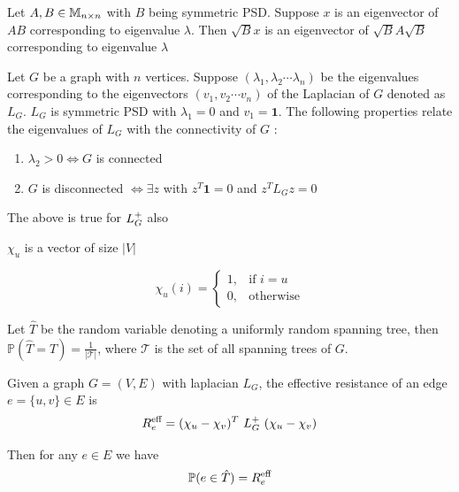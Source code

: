 \begin{HXf}
 Let $A, B \in \mathbb{M}_{n \times n}$ with $B$ being symmetric PSD. Suppose $x$ is an eigenvector of $AB$ corresponding to eigenvalue $\lambda$. Then $\sqrt{B} x$ is an eigenvector of $\sqrt{B}A\sqrt{B}$ corresponding to eigenvalue $\lambda$ 
\end{HXf}

\begin{HXf}
 Let $G$ be a graph with $n$ vertices. Suppose $(\lambda_1, \lambda_2 \cdots \lambda_n)$ be the eigenvalues corresponding to the eigenvectors $(v_1, v_2 \cdots v_n) $ of the Laplacian of $G$ denoted as $L_G$. $L_G$ is symmetric PSD with $\lambda_1 = 0$ and $v_1 = \textbf{1}$. The following properties relate the eigenvalues of $L_G$ with the connectivity of $G$ :
 
\begin{enumerate}
 \item $\lambda_2 > 0 \iff G$ is connected
 \item $G$ is disconnected $\iff \exists z$ with $z^T \textbf{1} = 0$ and $z^T L_G z = 0$
\end{enumerate}

The above is true for $L_{G}^{+}$ also 
 
\end{HXf}


 \begin{HXd}[$\chi_u$]
 $\chi_u$ is a vector of size $|V|$

 \[
    \chi_u(i) = 
\begin{cases}
    1,& \text{if } i = u\\
    0,              & \text{otherwise}
\end{cases}
\]
 \end{HXd}

 \begin{HXd}
  Let $\hat{T}$ be the random variable denoting a uniformly random spanning tree, then $\mathbb{P}(\hat{T} = T) = \frac{1}{|\mathcal{T}|}$, where $\mathcal{T}$ is the set of all spanning trees of $G$. 
 \end{HXd}


\begin{HXf}
 Given a graph $G = (V,E)$ with laplacian $L_G$, the effective resistance of an edge $e = \{u, v\} \in E$ is 
 $$ R_e^{\text{eff}} =  (\chi_u - \chi_v)^T \ L_{G}^{+} \ (\chi_u - \chi_v)  $$
 
 Then for any $e \in E$ we have $$\mathbb{P}(e \in \hat{T}) = R_e^{\text{eff}}$$
 
\end{HXf}








